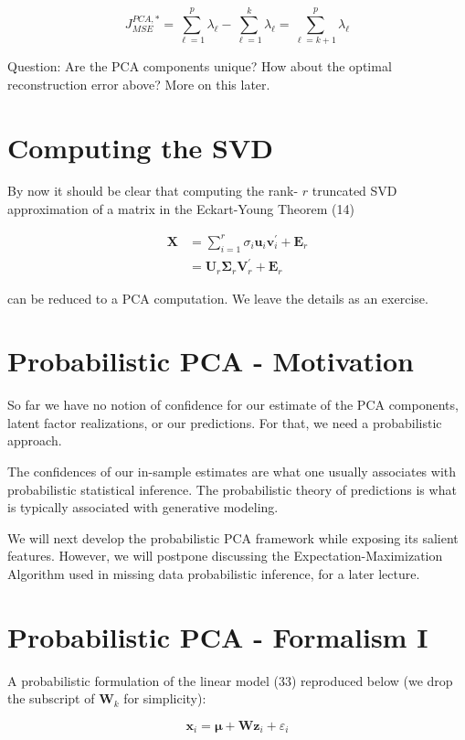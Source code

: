 \documentclass[11pt]{article}
\theoremstyle{plain} %
\theoremstyle{remark}
\begin{document}
$$
J_{M S E}^{P C A, *}=\sum_{\ell=1}^{p} \lambda_{\ell}-\sum_{\ell=1}^{k} \lambda_{\ell}=\sum_{\ell=k+1}^{p} \lambda_{\ell}
$$

Question: Are the PCA components unique? How about the optimal reconstruction error above? More on this later.

\section*{Computing the SVD}
By now it should be clear that computing the rank- $r$ truncated SVD approximation of a matrix in the Eckart-Young Theorem (14)

$$
\begin{aligned}
\mathbf{X} & =\sum_{i=1}^{r} \sigma_{i} \mathbf{u}_{i} \mathbf{v}_{i}^{\prime}+\mathbf{E}_{r} \\
& =\mathbf{U}_{r} \boldsymbol{\Sigma}_{r} \mathbf{V}_{r}^{\prime}+\mathbf{E}_{r}
\end{aligned}
$$

can be reduced to a PCA computation. We leave the details as an exercise.

\section*{Probabilistic PCA - Motivation}
So far we have no notion of confidence for our estimate of the PCA components, latent factor realizations, or our predictions. For that, we need a probabilistic approach.

The confidences of our in-sample estimates are what one usually associates with probabilistic statistical inference. The probabilistic theory of predictions is what is typically associated with generative modeling.

We will next develop the probabilistic PCA framework while exposing its salient features. However, we will postpone discussing the Expectation-Maximization Algorithm used in missing data probabilistic inference, for a later lecture.

\section*{Probabilistic PCA - Formalism I}
A probabilistic formulation of the linear model (33) reproduced below (we drop the subscript of $\mathbf{W}_{k}$ for simplicity):

$$
\mathbf{x}_{i}=\boldsymbol{\mu}+\mathbf{W} \mathbf{z}_{i}+\varepsilon_{i}
$$
\end{document}
